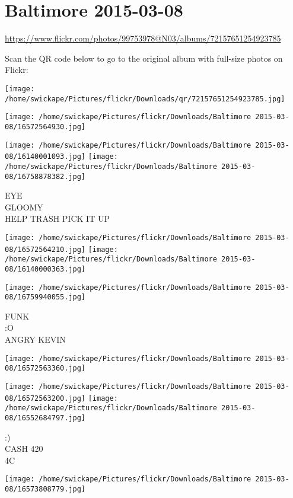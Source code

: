 \documentclass[10pt,letterpaper]{article}
\title{}
\author{}
\date{}
\begin{document}
\section*{Baltimore 2015-03-08}

\url{https://www.flickr.com/photos/99753978@N03/albums/72157651254923785}

Scan the QR code below to go to the original album with full-size photos on Flickr:

\texttt{[image: /home/swickape/Pictures/flickr/Downloads/qr/72157651254923785.jpg]}
\pagebreak

\texttt{[image: /home/swickape/Pictures/flickr/Downloads/Baltimore 2015-03-08/16572564930.jpg]}

\vspace{0.25in}
\texttt{[image: /home/swickape/Pictures/flickr/Downloads/Baltimore 2015-03-08/16140001093.jpg]}
\texttt{[image: /home/swickape/Pictures/flickr/Downloads/Baltimore 2015-03-08/16758878382.jpg]}

EYE\\
GLOOMY\\
HELP TRASH PICK IT UP
\pagebreak

\texttt{[image: /home/swickape/Pictures/flickr/Downloads/Baltimore 2015-03-08/16572564210.jpg]}
\texttt{[image: /home/swickape/Pictures/flickr/Downloads/Baltimore 2015-03-08/16140000363.jpg]}

\texttt{[image: /home/swickape/Pictures/flickr/Downloads/Baltimore 2015-03-08/16759940055.jpg]}

FUNK\\
:O\\
ANGRY KEVIN
\pagebreak

\texttt{[image: /home/swickape/Pictures/flickr/Downloads/Baltimore 2015-03-08/16572563360.jpg]}

\vspace{0.25in}
\texttt{[image: /home/swickape/Pictures/flickr/Downloads/Baltimore 2015-03-08/16572563200.jpg]}
\texttt{[image: /home/swickape/Pictures/flickr/Downloads/Baltimore 2015-03-08/16552684797.jpg]}

:)\\
CASH 420\\
4C
\pagebreak

\texttt{[image: /home/swickape/Pictures/flickr/Downloads/Baltimore 2015-03-08/16573808779.jpg]}
\end{document}
